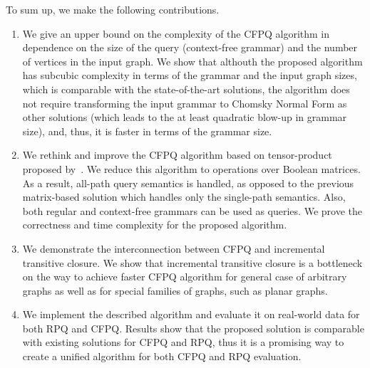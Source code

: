To sum up, we make the following contributions.
\begin{enumerate}
        \item We give an upper bound on the complexity of the CFPQ algorithm in dependence on the size of the query (context-free grammar) and the number of vertices in the input graph. We show that althouth the proposed algorithm has subcubic complexity in terms of the grammar and the input graph sizes, which is comparable with the state-of-the-art solutions, the algorithm does not require transforming the input grammar to Chomsky Normal Form as other solutions (which leads to the at least quadratic blow-up in grammar size), and, thus, it is faster in terms of the grammar size.
	\item We rethink and improve the CFPQ algorithm based on tensor-product proposed by~\cite{10.1007/978-3-030-54832-2_6}.
	We reduce this algorithm to operations over Boolean matrices.
	As a result, all-path query semantics is handled, as opposed to the previous matrix-based solution which handles only the single-path semantics. 
	Also, both regular and context-free grammars can be used as queries.
	We prove the correctness and time complexity for the proposed algorithm.
	\item We demonstrate the interconnection between CFPQ and incremental transitive closure.
	We show that incremental transitive closure is a bottleneck on the way to achieve faster CFPQ algorithm for general case of arbitrary graphs as well as for special families of graphs, such as planar graphs.
	\item We implement the described algorithm and evaluate it on real-world data for both RPQ and CFPQ. Results show that the proposed solution is comparable with existing solutions for CFPQ and RPQ, thus it is a promising way to create a unified algorithm for both CFPQ and RPQ evaluation.
\end{enumerate}